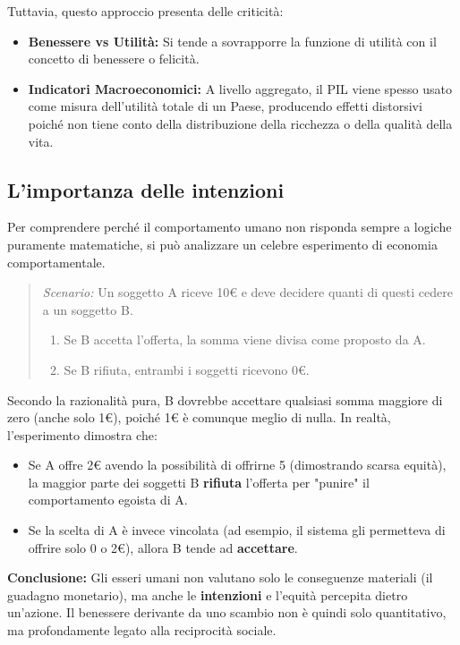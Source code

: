 \documentclass[a4paper,12pt]{article}
\begin{document}
	Tuttavia, questo approccio presenta delle criticità:
	\begin{itemize}
		\item \textbf{Benessere vs Utilità:} Si tende a sovrapporre la funzione di utilità con il concetto di benessere o felicità.
		\item \textbf{Indicatori Macroeconomici:} A livello aggregato, il PIL viene spesso usato come misura dell'utilità totale di un Paese, producendo effetti distorsivi poiché non tiene conto della distribuzione della ricchezza o della qualità della vita.
	\end{itemize}
	
	\subsection{L'importanza delle intenzioni}
	Per comprendere perché il comportamento umano non risponda sempre a logiche puramente matematiche, si può analizzare un celebre esperimento di economia comportamentale.
	
	\begin{quote}
		\textit{Scenario:} Un soggetto A riceve 10€ e deve decidere quanti di questi cedere a un soggetto B. 
		\begin{enumerate}
			\item Se B accetta l'offerta, la somma viene divisa come proposto da A.
			\item Se B rifiuta, entrambi i soggetti ricevono 0€.
		\end{enumerate}
	\end{quote}
	
	Secondo la razionalità pura, B dovrebbe accettare qualsiasi somma maggiore di zero (anche solo 1€), poiché 1€ è comunque meglio di nulla. In realtà, l'esperimento dimostra che:
	\begin{itemize}
		\item Se A offre 2€ avendo la possibilità di offrirne 5 (dimostrando scarsa equità), la maggior parte dei soggetti B \textbf{rifiuta} l'offerta per "punire" il comportamento egoista di A.
		\item Se la scelta di A è invece vincolata (ad esempio, il sistema gli permetteva di offrire solo 0 o 2€), allora B tende ad \textbf{accettare}.
	\end{itemize}
	
	\textbf{Conclusione:} Gli esseri umani non valutano solo le conseguenze materiali (il guadagno monetario), ma anche le \textbf{intenzioni} e l'equità percepita dietro un'azione. Il benessere derivante da uno scambio non è quindi solo quantitativo, ma profondamente legato alla reciprocità sociale.
	
\end{document}

